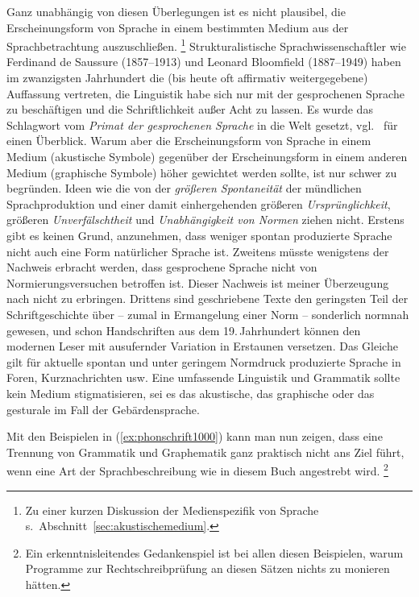 Ganz unabhängig von diesen Überlegungen ist es nicht plausibel, die Erscheinungsform von Sprache in einem bestimmten Medium aus der Sprachbetrachtung auszuschließen.%
\footnote{Zu einer kurzen Diskussion der Medienspezifik von Sprache s.\ Abschnitt~\ref{sec:akustischemedium}.}
Strukturalistische Sprachwissenschaftler wie Ferdinand de Saussure (1857--1913) und Leonard Bloomfield (1887--1949) haben im zwanzigsten Jahrhundert die (bis heute oft affirmativ weitergegebene) Auffassung vertreten, die Linguistik habe sich nur mit der gesprochenen Sprache zu beschäftigen und die Schriftlichkeit außer Acht zu lassen.
Es wurde das Schlagwort vom \textit{Primat der gesprochenen Sprache} in die Welt gesetzt, vgl.\ \cite[Kapitel~0]{Duerscheid2012a} für einen Überblick.
Warum aber die Erscheinungsform von Sprache in einem Medium (akustische Symbole) gegenüber der Erscheinungsform in einem anderen Medium (graphische Symbole) höher gewichtet werden sollte, ist nur schwer zu begründen.
Ideen wie die von der \textit{größeren Spontaneität} der mündlichen Sprachproduktion und einer damit einhergehenden größeren \textit{Ursprünglichkeit}, größeren \textit{Unverfälschtheit} und \textit{Unabhängigkeit von Normen} ziehen nicht.
Erstens gibt es keinen Grund, anzunehmen, dass weniger spontan produzierte Sprache nicht auch eine Form natürlicher Sprache ist.
Zweitens müsste wenigstens der Nachweis erbracht werden, dass gesprochene Sprache nicht von Normierungsversuchen betroffen ist.
Dieser Nachweis ist meiner Überzeugung nach nicht zu erbringen.
Drittens sind geschriebene Texte den geringsten Teil der Schriftgeschichte über -- zumal in Ermangelung einer Norm -- sonderlich normnah gewesen, und schon Handschriften aus dem 19.\,Jahrhundert können den modernen Leser mit ausufernder Variation in Erstaunen versetzen.
Das Gleiche gilt für aktuelle spontan und unter geringem Normdruck produzierte Sprache in Foren, Kurznachrichten usw.
Eine umfassende Linguistik und Grammatik sollte kein Medium stigmatisieren, sei es das akustische, das graphische oder \zB das gesturale im Fall der Gebärdensprache.

Mit den Beispielen in (\ref{ex:phonschrift1000}) kann man nun zeigen, dass eine Trennung von Grammatik und Graphematik ganz praktisch nicht ans Ziel führt, wenn eine Art der Sprachbeschreibung wie in diesem Buch angestrebt wird.%
\footnote{Ein erkenntnisleitendes Gedankenspiel ist bei allen diesen Beispielen, warum Programme zur Rechtschreibprüfung an diesen Sätzen nichts zu monieren hätten.}

\begin{exe}
  \ex\label{ex:phonschrift1000} 
  \begin{xlist}
  \end{xlist}
\end{exe}

